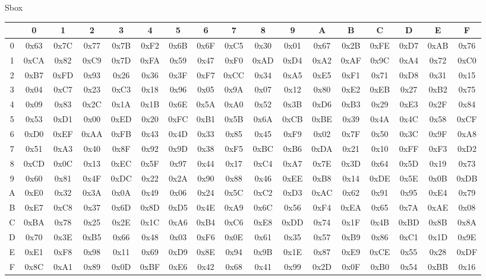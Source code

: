 \begin{frame}[t]{Sbox}
	\begin{table}[]
		\tiny 
		\setlength{\tabcolsep}{2pt} 
		\begin{tabular}{c|cccccccccccccccc}
			& 0    &    1 &    2 &    3 &    4 &    5 &    6 &    7 &    8 &    9 &    A &    B &  C &   D  &  E &  F \\ \hline
			0 & 0x63 & 0x7C & 0x77 & 0x7B & 0xF2 & 0x6B & 0x6F & 0xC5 & 0x30 & 0x01 & 0x67 & 0x2B & 0xFE & 0xD7 & 0xAB & 0x76 \\
			1 & 0xCA & 0x82 & 0xC9 & 0x7D & 0xFA & 0x59 & 0x47 & 0xF0 & 0xAD & 0xD4 & 0xA2 & 0xAF & 0x9C & 0xA4 & 0x72 & 0xC0 \\
			2 & 0xB7 & 0xFD & 0x93 & 0x26 & 0x36 & 0x3F & 0xF7 & 0xCC & 0x34 & 0xA5 & 0xE5 & 0xF1 & 0x71 & 0xD8 & 0x31 & 0x15 \\
			3 & 0x04 & 0xC7 & 0x23 & 0xC3 & 0x18 & 0x96 & 0x05 & 0x9A & 0x07 & 0x12 & 0x80 & 0xE2 & 0xEB & 0x27 & 0xB2 & 0x75 \\
			4 & 0x09 & 0x83 & 0x2C & 0x1A & 0x1B & 0x6E & 0x5A & 0xA0 & 0x52 & 0x3B & 0xD6 & 0xB3 & 0x29 & 0xE3 & 0x2F & 0x84 \\
			5 & 0x53 & 0xD1 & 0x00 & 0xED & 0x20 & 0xFC & 0xB1 & 0x5B & 0x6A & 0xCB & 0xBE & 0x39 & 0x4A & 0x4C & 0x58 & 0xCF \\
			6 & 0xD0 & 0xEF & 0xAA & 0xFB & 0x43 & 0x4D & 0x33 & 0x85 & 0x45 & 0xF9 & 0x02 & 0x7F & 0x50 & 0x3C & 0x9F & 0xA8 \\
			7 & 0x51 & 0xA3 & 0x40 & 0x8F & 0x92 & 0x9D & 0x38 & 0xF5 & 0xBC & 0xB6 & 0xDA & 0x21 & 0x10 & 0xFF & 0xF3 & 0xD2 \\
			8 & 0xCD & 0x0C & 0x13 & 0xEC & 0x5F & 0x97 & 0x44 & 0x17 & 0xC4 & 0xA7 & 0x7E & 0x3D & 0x64 & 0x5D & 0x19 & 0x73 \\
			9 & 0x60 & 0x81 & 0x4F & 0xDC & 0x22 & 0x2A & 0x90 & 0x88 & 0x46 & 0xEE & 0xB8 & 0x14 & 0xDE & 0x5E & 0x0B & 0xDB \\
			A & 0xE0 & 0x32 & 0x3A & 0x0A & 0x49 & 0x06 & 0x24 & 0x5C & 0xC2 & 0xD3 & 0xAC & 0x62 & 0x91 & 0x95 & 0xE4 & 0x79 \\
			B & 0xE7 & 0xC8 & 0x37 & 0x6D & 0x8D & 0xD5 & 0x4E & 0xA9 & 0x6C & 0x56 & 0xF4 & 0xEA & 0x65 & 0x7A & 0xAE & 0x08 \\
			C & 0xBA & 0x78 & 0x25 & 0x2E & 0x1C & 0xA6 & 0xB4 & 0xC6 & 0xE8 & 0xDD & 0x74 & 0x1F & 0x4B & 0xBD & 0x8B & 0x8A \\
			D & 0x70 & 0x3E & 0xB5 & 0x66 & 0x48 & 0x03 & 0xF6 & 0x0E & 0x61 & 0x35 & 0x57 & 0xB9 & 0x86 & 0xC1 & 0x1D & 0x9E \\
			E & 0xE1 & 0xF8 & 0x98 & 0x11 & 0x69 & 0xD9 & 0x8E & 0x94 & 0x9B & 0x1E & 0x87 & 0xE9 & 0xCE & 0x55 & 0x28 & 0xDF \\
			F & 0x8C & 0xA1 & 0x89 & 0x0D & 0xBF & 0xE6 & 0x42 & 0x68 & 0x41 & 0x99 & 0x2D & 0x0F & 0xB0 & 0x54 & 0xBB & 0x16 
		\end{tabular}
	\end{table}
\end{frame}

